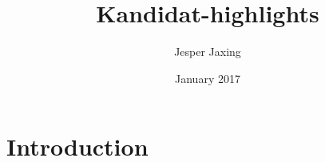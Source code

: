 \documentclass{article}
\title{Kandidat-highlights}
\author{Jesper Jaxing}
\date{January 2017}
\begin{document}
\maketitle

\section{Introduction}
\end{document}
